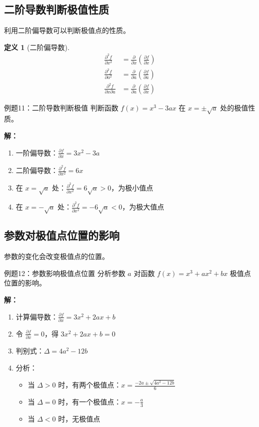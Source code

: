 \documentclass[a4paper,11pt]{ctexart}
\newcommand{\partialder}[2]{\frac{\partial #1}{\partial #2}}
\theoremstyle{definition}
\newtheorem{definition}{定义}[section]
\theoremstyle{remark}
\begin{document}
\subsection{二阶导数判断极值性质}

利用二阶偏导数可以判断极值点的性质。

\begin{definition}[二阶偏导数]
\begin{align}
\frac{\partial^2 f}{\partial x^2} &= \frac{\partial}{\partial x}\left(\frac{\partial f}{\partial x}\right) \\
\frac{\partial^2 f}{\partial a^2} &= \frac{\partial}{\partial a}\left(\frac{\partial f}{\partial a}\right) \\
\frac{\partial^2 f}{\partial x \partial a} &= \frac{\partial}{\partial a}\left(\frac{\partial f}{\partial x}\right)
\end{align}
\end{definition}

\begin{examplebox}{例题11：二阶导数判断极值}
判断函数 $f(x) = x^3 - 3ax$ 在 $x = \pm\sqrt{a}$ 处的极值性质。

\textbf{解：}
\begin{enumerate}
    \item 一阶偏导数：$\partialder{f}{x} = 3x^2 - 3a$
    \item 二阶偏导数：$\frac{\partial^2 f}{\partial x^2} = 6x$
    \item 在 $x = \sqrt{a}$ 处：$\frac{\partial^2 f}{\partial x^2} = 6\sqrt{a} > 0$，为极小值点
    \item 在 $x = -\sqrt{a}$ 处：$\frac{\partial^2 f}{\partial x^2} = -6\sqrt{a} < 0$，为极大值点
\end{enumerate}
\end{examplebox}

\subsection{参数对极值点位置的影响}

参数的变化会改变极值点的位置。

\begin{examplebox}{例题12：参数影响极值点位置}
分析参数 $a$ 对函数 $f(x) = x^3 + ax^2 + bx$ 极值点位置的影响。

\textbf{解：}
\begin{enumerate}
    \item 计算偏导数：$\partialder{f}{x} = 3x^2 + 2ax + b$
    \item 令 $\partialder{f}{x} = 0$，得 $3x^2 + 2ax + b = 0$
    \item 判别式：$\Delta = 4a^2 - 12b$
    \item 分析：
    \begin{itemize}
        \item 当 $\Delta > 0$ 时，有两个极值点：$x = \frac{-2a \pm \sqrt{4a^2 - 12b}}{6}$
        \item 当 $\Delta = 0$ 时，有一个极值点：$x = -\frac{a}{3}$
        \item 当 $\Delta < 0$ 时，无极值点
    \end{itemize}
\end{enumerate}
\end{examplebox}
\end{document}
